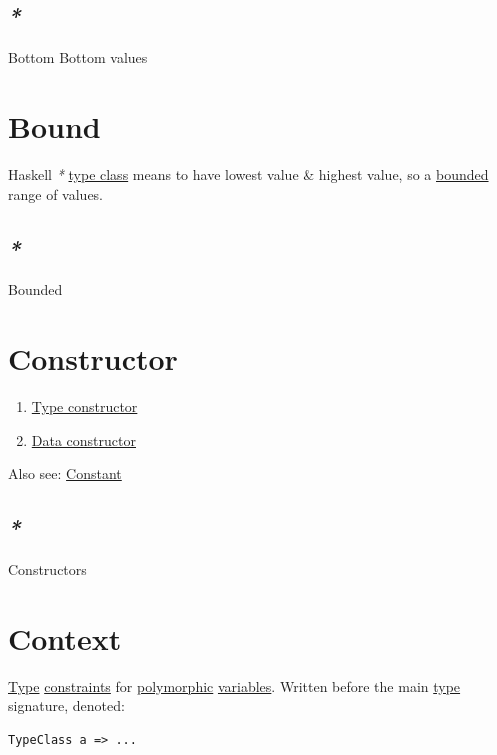 \documentclass[a4paper,14pt,oneside]{book}
\begin{document}
\subsection{\emph{*}}
\label{sec:org831e76f}

\label{org3c07e93}Bottom
\label{org20a63fb}Bottom values

\section{\label{orgf9c4712}Bound}
\label{sec:orgc09c5a7}
Haskell \emph{*} \hyperref[org8cb2c3b]{type class} means to have lowest value \& highest value, so a \hyperref[orgd43cb6a]{bounded} range of values.

\subsection{\emph{*}}
\label{sec:org459e581}

\label{orgd43cb6a}Bounded

\section{\label{orgef7386c}Constructor}
\label{sec:orge06bbc0}
\begin{enumerate}
\item \hyperref[org7b71390]{Type constructor}
\item \hyperref[org40b5390]{Data constructor}
\end{enumerate}

Also see: \hyperref[orgbe87fd2]{Constant}

\subsection{\emph{*}}
\label{sec:orge970e6a}

\label{org40e6ba1}Constructors

\section{\label{org93ac18e}Context}
\label{sec:org7b90d01}
\hyperref[org1eff537]{Type} \hyperref[org2daa28c]{constraints} for \hyperref[org5ea9f01]{polymorphic} \hyperref[orgb328db2]{variables}.
Written before the main \hyperref[org1eff537]{type} signature, denoted:
\begin{verbatim}
TypeClass a => ...
\end{verbatim}
\end{document}
